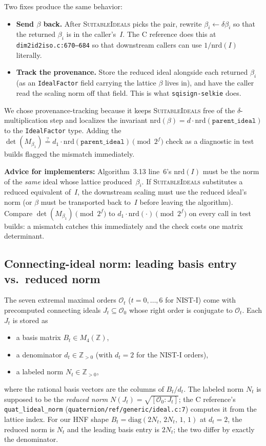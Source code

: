 Two fixes produce the same behavior:
\begin{itemize}
  \item \textbf{Send $\beta$ back.}  After \textsc{SuitableIdeals}
    picks the pair, rewrite $\beta_i \leftarrow \delta \beta_i$ so
    that the returned $\beta_i$ is in the caller's~$I$.  The C
    reference does this at \texttt{dim2id2iso.c:670--684} so that
    downstream callers can use $1/\mathrm{nrd}(I)$ literally.
  \item \textbf{Track the provenance.}  Store the reduced ideal
    alongside each returned $\beta_i$ (as an \texttt{IdealFactor}
    field carrying the lattice $\beta$ lives in), and have the
    caller read the scaling norm off that field.  This is what
    \texttt{sqisign-selkie} does.
\end{itemize}
We chose provenance-tracking because it keeps
\textsc{SuitableIdeals} free of the $\delta$-multiplication step
and localizes the invariant
$\mathrm{nrd}(\beta) = d \cdot \mathrm{nrd}(\mathtt{parent\_ideal})$
to the \texttt{IdealFactor} type.  Adding the
$\det(M_{\beta_1}) \stackrel{?}{=} d_1 \cdot
\mathrm{nrd}(\mathtt{parent\_ideal}) \pmod{2^f}$ check as a
diagnostic in test builds flagged the mismatch immediately.

\noindent
\textbf{Advice for implementers:} Algorithm~3.13 line~6's
$\mathrm{nrd}(I)$ must be the norm of the \emph{same} ideal whose
lattice produced~$\beta_i$.  If \textsc{SuitableIdeals}
substitutes a reduced equivalent of~$I$, the downstream scaling
must use the reduced ideal's norm (or $\beta$ must be transported
back to~$I$ before leaving the algorithm).  Compare
$\det(M_{\beta_1}) \pmod{2^f}$ to $d_1 \cdot \mathrm{nrd}(\cdot)
\pmod{2^f}$ on every call in test builds: a mismatch catches this
immediately and the check costs one matrix determinant.

\subsection{Connecting-ideal norm: leading basis entry vs.\
  reduced norm}
\label{sec:bug-connecting-ideal-norm}

The seven extremal maximal orders $\mathcal{O}_t$ ($t = 0, \ldots, 6$
for NIST-I) come with precomputed connecting ideals
$J_t \subseteq \mathcal{O}_0$ whose right order is conjugate to
$\mathcal{O}_t$.  Each $J_t$ is stored as
\begin{itemize}
\item a basis matrix $B_t \in M_4(\mathbb{Z})$,
\item a denominator $d_t \in \mathbb{Z}_{>0}$ (with $d_t = 2$ for
  the NIST-I orders),
\item a labeled norm $N_t \in \mathbb{Z}_{>0}$,
\end{itemize}
where the rational basis vectors are the columns of $B_t / d_t$.
The labeled norm $N_t$ is supposed to be the \emph{reduced norm}
$N(J_t) = \sqrt{[\mathcal{O}_0 : J_t]}$; the C reference's
\texttt{quat\_lideal\_norm}
(\texttt{quaternion/ref/generic/ideal.c:7}) computes it from the
lattice index.  For our HNF shape
$B_t = \mathrm{diag}(2N_t,\, 2N_t,\, 1,\, 1)$ at $d_t = 2$, the
reduced norm is $N_t$ and the leading basis entry is $2 N_t$;
the two differ by exactly the denominator.

